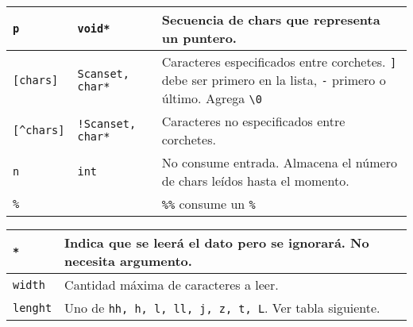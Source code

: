 \begin{center}
{\begin{xtabular}{|C{.15\columnwidth}|C{.15\columnwidth}|L{.7\columnwidth}|}
\texttt{p}                            & \texttt{void*}           & Secuencia de chars que representa un puntero.                                                                                                        \\ \hline
\texttt{{[}chars{]}}                  & \texttt{Scanset, char*}  & Caracteres especificados entre corchetes. \texttt{{]}} debe ser primero en la lista, \texttt{-} primero o \'ultimo. Agrega \texttt{\textbackslash 0} \\ \hline
\texttt{{[}\textasciicircum chars{]}} & \texttt{!Scanset, char*} & Caracteres no especificados entre corchetes.                                                                                                         \\ \hline
\texttt{n}                            & \texttt{int}             & No consume entrada. Almacena el n\'umero de chars le\'idos hasta el momento.                                                                         \\ \hline
\texttt{\%}                           &                          & \texttt{\%\%} consume un \texttt{\%}                                                                                                                 \\
\end{xtabular}
}

\vspace{0.2cm}

\tabletail{\hline}
\tablelasttail{\hline}
\footnotesize
{
\begin{xtabular}[!]{|C{.2\columnwidth}|L{.8\columnwidth}|}
\texttt{*}   & Indica que se leer\'a el dato pero se ignorar\'a. No necesita argumento. \\ \hline
\texttt{width}  & Cantidad m\'axima de caracteres a leer. \\ \hline
\texttt{lenght} & Uno de \texttt{hh, h, l, ll, j, z, t, L}. Ver tabla siguiente. \\
\end{xtabular}
}

\vspace{0.2cm}


\end{center}
